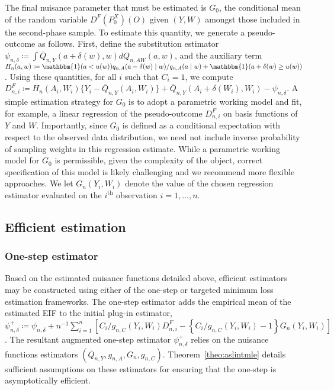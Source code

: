 The final nuisance parameter that must be estimated is $G_0$, the conditional
mean of the random variable $D^F(P_0^X)(O)$ given $(Y,W)$ amongst those included
in the second-phase sample. To estimate this quantity, we generate
a pseudo-outcome as follows. First, define the substitution estimator
$\psi_{n,\delta} \coloneqq \int \overline{Q}_{n,Y}(a + \delta(w), w)
dQ_{n,AW}(a,w)$, and the auxiliary term $H_n(a,w) \coloneqq \mathbbm{1}(a <
u(w)) q_{n,A}(a - \delta(w) \mid w)/q_{n,A}(a \mid w) + \mathbbm{1}(a +
\delta(w) \ge u(w))$.
Using these quantities, for all $i$ such that $C_i = 1$, we compute $D^F_{n,i}
\coloneqq H_n(A_i, W_i) \{Y_i - \overline{Q}_{n,Y}(A_i, W_i)\}
+ \overline{Q}_{n,Y}(A_i + \delta(W_i), W_i) - \psi_{n,\delta}$.
A simple estimation strategy for $G_0$ is to adopt a parametric working model
and fit, for example, a linear regression of the pseudo-outcome $D^F_{n,i}$ on
basis functions of $Y$ and $W$. Importantly, since $G_0$ is defined as
a conditional expectation with respect to the observed data distribution, we
need not include inverse probability of sampling weights in this regression
estimate. While a parametric working model for $G_0$ is permissible, given the
complexity of the object, correct specification of this model is likely
challenging and we recommend more flexible approaches. We let $G_n(Y_i,W_i)$
denote the value of the chosen regression estimator evaluated on the
$i^\text{th}$ observation $i = 1, \ldots, n$.

\subsection{Efficient estimation}\label{os_tml_est}

\subsubsection{One-step estimator}

Based on the estimated nuisance functions detailed above, efficient estimators
may be constructed using either of the one-step or targeted minimum loss
estimation frameworks. The one-step estimator adds the empirical mean of the
estimated EIF to the initial plug-in estimator, $\psi_{n,\delta}^{+} \coloneqq
\psi_{n,\delta} + n^{-1} \sum_{i=1}^n \left[C_i/g_{n,C}(Y_i,W_i) D^F_{n,i} -
\left\{C_i/g_{n,C}(Y_i,W_i) - 1\right\} G_n(Y_i,W_i) \right]$.
The resultant augmented one-step estimator $\psi_{n,\delta}^{+}$ relies on the
nuisance functions estimators $(\overline{Q}_{n,Y}, g_{n,A}, G_n, g_{n,C})$.
Theorem~\ref{theo:aslintmle} details sufficient assumptions on these estimators
for ensuring that the one-step is asymptotically efficient.

